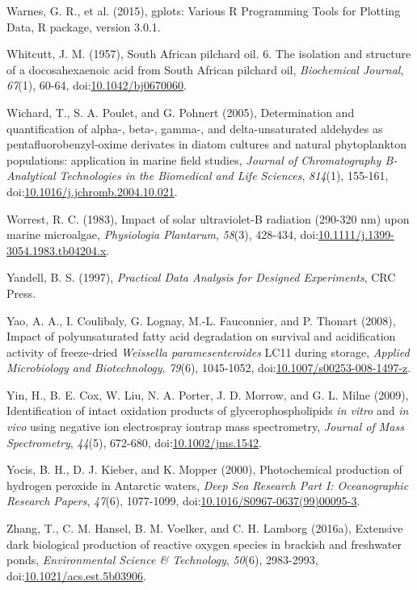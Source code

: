 \begin{singlespace}
{{Warnes, G. R., et al. (2015), gplots: Various R Programming Tools for Plotting Data, R package, version 3.0.1.

Whitcutt, J. M. (1957), South African pilchard oil. 6. The isolation and structure of a docosahexaenoic acid from South African pilchard oil, \emph{Biochemical Journal}, \emph{67}(1), 60-64, doi:\href{http://dx.doi.org/10.1042/bj0670060}{10.1042/bj0670060}.

Wichard, T., S. A. Poulet, and G. Pohnert (2005), Determination and quantification of alpha-, beta-, gamma-, and delta-unsaturated aldehydes as pentafluorobenzyl-oxime derivates in diatom cultures and natural phytoplankton populations: application in marine field studies, \emph{Journal of Chromatography B-Analytical Technologies in the Biomedical and Life Sciences}, \emph{814}(1), 155-161, doi:\href{http://dx.doi.org/10.1016/j.jchromb.2004.10.021}{10.1016/j.jchromb.2004.10.021}.

Worrest, R. C. (1983), Impact of solar ultraviolet-B radiation (290-320 nm) upon marine microalgae, \emph{Physiologia Plantarum}, \emph{58}(3), 428-434, doi:\href{http://dx.doi.org/10.1111/j.1399-3054.1983.tb04204.x}{10.1111/j.1399-3054.1983.tb04204.x}.

Yandell, B. S. (1997), \emph{Practical Data Analysis for Designed Experiments}, CRC Press.

Yao, A. A., I. Coulibaly, G. Lognay, M.-L. Fauconnier, and P. Thonart (2008), Impact of polyunsaturated fatty acid degradation on survival and acidification activity of freeze-dried \emph{Weissella paramesenteroides} LC11 during storage, \emph{Applied Microbiology and Biotechnology}, \emph{79}(6), 1045-1052, doi:\href{http://dx.doi.org/10.1007/s00253-008-1497-z}{10.1007/s00253-008-1497-z}.

Yin, H., B. E. Cox, W. Liu, N. A. Porter, J. D. Morrow, and G. L. Milne (2009), Identification of intact oxidation products of glycerophospholipids \emph{in vitro} and \emph{in vivo} using negative ion electrospray iontrap mass spectrometry, \emph{Journal of Mass Spectrometry}, \emph{44}(5), 672-680, doi:\href{http://dx.doi.org/10.1002/jms.1542}{10.1002/jms.1542}.

Yocis, B. H., D. J. Kieber, and K. Mopper (2000), Photochemical production of hydrogen peroxide in Antarctic waters, \emph{Deep Sea Research Part I: Oceanographic Research Papers}, \emph{47}(6), 1077-1099, doi:\href{http://dx.doi.org/10.1016/S0967-0637(99)00095-3}{10.1016/S0967-0637(99)00095-3}.

Zhang, T., C. M. Hansel, B. M. Voelker, and C. H. Lamborg (2016a), Extensive dark biological production of reactive oxygen species in brackish and freshwater ponds, \emph{Environmental Science \& Technology}, \emph{50}(6), 2983-2993, doi:\href{http://dx.doi.org/10.1021/acs.est.5b03906}{10.1021/acs.est.5b03906}.

}}
\end{singlespace}
